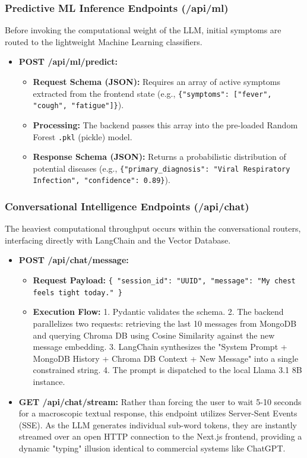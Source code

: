 \documentclass[12pt]{article}
\begin{document}
\subsubsection{Predictive ML Inference Endpoints (/api/ml)}
Before invoking the computational weight of the LLM, initial symptoms are routed to the lightweight Machine Learning classifiers.
\begin{itemize}
    \item \textbf{POST /api/ml/predict:} 
    \begin{itemize}
        \item \textbf{Request Schema (JSON):} Requires an array of active symptoms extracted from the frontend state (e.g., \texttt{\{"symptoms": ["fever", "cough", "fatigue"]\}}).
        \item \textbf{Processing:} The backend passes this array into the pre-loaded Random Forest \texttt{.pkl} (pickle) model.
        \item \textbf{Response Schema (JSON):} Returns a probabilistic distribution of potential diseases (e.g., \texttt{\{"primary\_diagnosis": "Viral Respiratory Infection", "confidence": 0.89\}}).
    \end{itemize}
\end{itemize}

\subsubsection{Conversational Intelligence Endpoints (/api/chat)}
The heaviest computational throughput occurs within the conversational routers, interfacing directly with LangChain and the Vector Database.
\begin{itemize}
    \item \textbf{POST /api/chat/message:} 
    \begin{itemize}
        \item \textbf{Request Payload:} \texttt{\{ "session\_id": "UUID", "message": "My chest feels tight today." \}}
        \item \textbf{Execution Flow:} 
            1. Pydantic validates the schema. 
            2. The backend parallelizes two requests: retrieving the last 10 messages from MongoDB and querying Chroma DB using Cosine Similarity against the new message embedding.
            3. LangChain synthesizes the "System Prompt + MongoDB History + Chroma DB Context + New Message" into a single constrained string.
            4. The prompt is dispatched to the local Llama 3.1 8B instance.
    \end{itemize}
    \item \textbf{GET /api/chat/stream:} Rather than forcing the user to wait 5-10 seconds for a macroscopic textual response, this endpoint utilizes Server-Sent Events (SSE). As the LLM generates individual sub-word tokens, they are instantly streamed over an open HTTP connection to the Next.js frontend, providing a dynamic "typing" illusion identical to commercial systems like ChatGPT.
\end{itemize}
\end{document}
